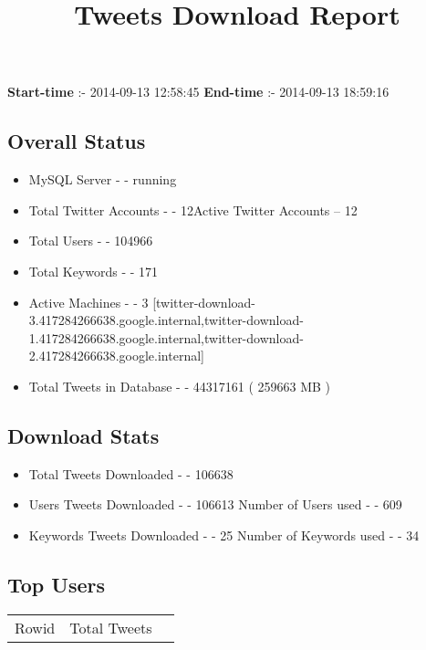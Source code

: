 \documentclass{article}\usepackage[T1]{fontenc}
\begin{document}
\title{\textbf{Tweets Download Report}}
               \date{}
                \maketitle
               \centerline{\textbf{Start-time} :- 2014-09-13 12:58:45 \hspace{40pt} \textbf{End-time} :- 2014-09-13 18:59:16}               \subsection*{Overall Status}                \begin{itemize}                \item MySQL Server - - running               \item Total Twitter Accounts - - 12\newline Active Twitter Accounts -- 12               \item Total Users - - 104966               \item Total Keywords - - 171               \item Active Machines - - 3 [twitter-download-3.417284266638.google.internal,twitter-download-1.417284266638.google.internal,twitter-download-2.417284266638.google.internal]               \item Total Tweets in Database - - 44317161 ( 259663 MB )               \end{itemize}               \subsection*{Download Stats}                \begin{itemize}                \item Total Tweets Downloaded - - 106638               \item Users Tweets Downloaded - - 106613 \newline Number of Users used - - 609               \item Keywords Tweets Downloaded - - 25 \newline Number of Keywords used - - 34              \end{itemize}              \subsection*{Top Users}\begin{tabular}{|c|c|c|}         \hline         Rowid & Total Tweets \\ 

\end{tabular}
\end{document}
